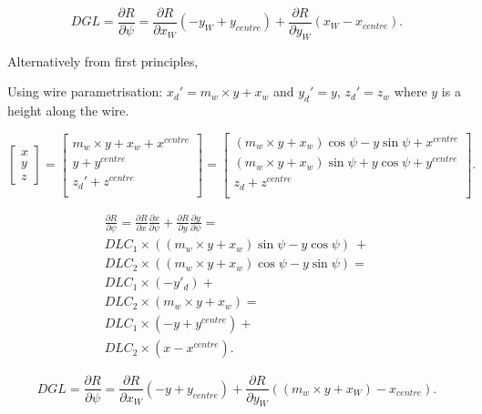 \documentclass[a4paper,11pt]{article}
\begin{document}
\begin{equation}
DGL = \frac{ \partial R}{\partial \psi} = \frac{ \partial R}{\partial x_W} (-y_W + y_{centre}) + \frac{ \partial R}{\partial y_W} (x_W - x_{centre}).
\end{equation}


Alternatively from first principles,

Using wire parametrisation: $x_d'=m_w \times y+x_w$ and $y_d'=y$, $z_d'=z_w$ where $y$ is a height along the wire. 

\begin{equation}
\begin{bmatrix}x\\y\\z\end{bmatrix}=\begin{bmatrix}m_w \times y+x_w+x^{centre}\\ y + y^{centre} \\z_d'+z^{centre}\\\end{bmatrix}=\begin{bmatrix}(m_w \times y+x_w)\cos \psi - y\sin \psi + x^{centre} \\ (m_w \times y+x_w) \sin \psi + y \cos \psi + y^{centre} \\ z_d + z^{centre} \\\end{bmatrix}. \label{eq:global}
\end{equation}

\begin{equation}
\begin{split}
\frac{\partial R}{\partial\psi} = \frac{\partial R}{\partial x}\frac{\partial x}{\partial \psi} + \frac{\partial R}{\partial y}\frac{\partial y}{\partial \psi} = \\ DLC_1 \times ((m_w \times y+x_w)\sin \psi - y\cos \psi) \ + \\ DLC_2 \times ((m_w \times y+x_w)\cos \psi - y\sin \psi) = \\
DLC_1 \times (-y'_d) + \\ DLC_2 \times (m_w \times y+x_w) = \\
DLC_1 \times (-y + y^{centre}) + \\ DLC_2 \times (x - x^{centre}).
\end{split}
\end{equation}

\begin{equation}
DGL = \frac{ \partial R}{\partial \psi} = \frac{ \partial R}{\partial x_W} (-y + y_{centre}) + \frac{ \partial R}{\partial y_W} ((m_w \times y+x_W) - x_{centre}).
\end{equation}
\end{document}
